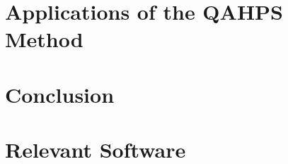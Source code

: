 \documentclass[12pt,twoside]{report}
\begin{document}
\chapter{Applications of the QAHPS Method}
\label{chap:applications}

\chapter{Conclusion}
\label{chap:conclusion}

{}


{}
\appendix
\chapter{Relevant Software}

% 
% 
% 
% 
\end{document}
